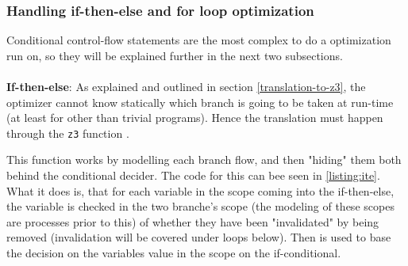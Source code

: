 \subsubsection{Handling if-then-else and for loop optimization } \label{sec:optLoopIte}
Conditional control-flow statements are the most complex to do a optimization run on, so they
will be explained further in the next two subsections.
\\
\\
\textbf{If-then-else}: As explained and outlined in section \ref{translation-to-z3}, the optimizer
cannot know statically which branch is going to be taken at run-time (at least for other than
trivial programs). Hence the translation must happen through the \texttt{z3} function
.

This function works by modelling each branch flow, and then "hiding" them both behind the
conditional decider. The code for this can bee seen in \autoref{listing:ite}. What it does
is, that for each variable in the scope coming into the if-then-else, the variable is checked
in the two branche's scope (the modeling of these scopes are processes prior to this) of whether
they have been "invalidated" by being removed (invalidation will be covered under loops below).
Then  is used to base the decision on the variables value in the scope on the
if-conditional.

